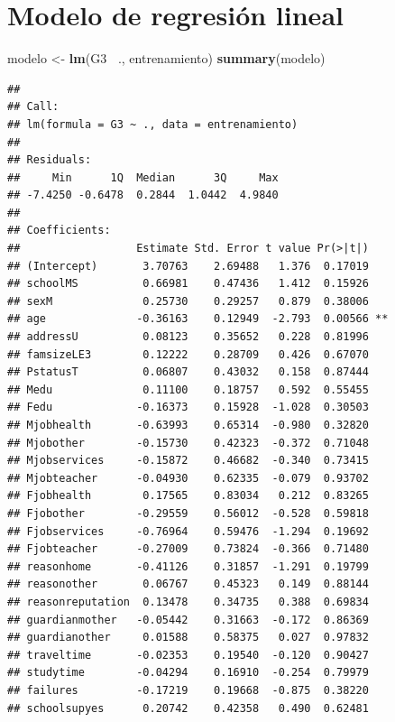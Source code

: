 \documentclass[
]{article}
\newenvironment{Shaded}{\begin{snugshade}}{\end{snugshade}}
\newcommand{\KeywordTok}[1]{\textcolor[rgb]{0.13,0.29,0.53}{\textbf{#1}}}
\newcommand{\NormalTok}[1]{#1}
\newcommand{\OperatorTok}[1]{\textcolor[rgb]{0.81,0.36,0.00}{\textbf{#1}}}
\newcommand{\StringTok}[1]{\textcolor[rgb]{0.31,0.60,0.02}{#1}}
\begin{document}
\hypertarget{modelo-de-regresiuxf3n-lineal}{%
\section{Modelo de regresión
lineal}\label{modelo-de-regresiuxf3n-lineal}}

\begin{Shaded}
\begin{Highlighting}[]
\NormalTok{modelo <-}\StringTok{ }\KeywordTok{lm}\NormalTok{(G3 }\OperatorTok{~}\NormalTok{., entrenamiento)}
\KeywordTok{summary}\NormalTok{(modelo)}
\end{Highlighting}
\end{Shaded}

\begin{verbatim}
## 
## Call:
## lm(formula = G3 ~ ., data = entrenamiento)
## 
## Residuals:
##     Min      1Q  Median      3Q     Max 
## -7.4250 -0.6478  0.2844  1.0442  4.9840 
## 
## Coefficients:
##                  Estimate Std. Error t value Pr(>|t|)    
## (Intercept)       3.70763    2.69488   1.376  0.17019    
## schoolMS          0.66981    0.47436   1.412  0.15926    
## sexM              0.25730    0.29257   0.879  0.38006    
## age              -0.36163    0.12949  -2.793  0.00566 ** 
## addressU          0.08123    0.35652   0.228  0.81996    
## famsizeLE3        0.12222    0.28709   0.426  0.67070    
## PstatusT          0.06807    0.43032   0.158  0.87444    
## Medu              0.11100    0.18757   0.592  0.55455    
## Fedu             -0.16373    0.15928  -1.028  0.30503    
## Mjobhealth       -0.63993    0.65314  -0.980  0.32820    
## Mjobother        -0.15730    0.42323  -0.372  0.71048    
## Mjobservices     -0.15872    0.46682  -0.340  0.73415    
## Mjobteacher      -0.04930    0.62335  -0.079  0.93702    
## Fjobhealth        0.17565    0.83034   0.212  0.83265    
## Fjobother        -0.29559    0.56012  -0.528  0.59818    
## Fjobservices     -0.76964    0.59476  -1.294  0.19692    
## Fjobteacher      -0.27009    0.73824  -0.366  0.71480    
## reasonhome       -0.41126    0.31857  -1.291  0.19799    
## reasonother       0.06767    0.45323   0.149  0.88144    
## reasonreputation  0.13478    0.34735   0.388  0.69834    
## guardianmother   -0.05442    0.31663  -0.172  0.86369    
## guardianother     0.01588    0.58375   0.027  0.97832    
## traveltime       -0.02353    0.19540  -0.120  0.90427    
## studytime        -0.04294    0.16910  -0.254  0.79979    
## failures         -0.17219    0.19668  -0.875  0.38220    
## schoolsupyes      0.20742    0.42358   0.490  0.62481    

\end{verbatim}
\end{document}
